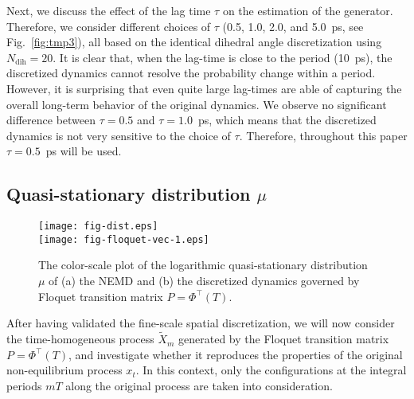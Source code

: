 \documentclass[journal=jctcce,manuscript=article]{achemso}
\newcommand{\vect}[1]{#1}
\newcommand{\myphi}{\Phi}
\newcommand{\mymu}{\mu}
\newcommand{\dih}{\textrm{dih}}
\begin{document}
Next, we discuss the effect of the lag time $\tau$ on the estimation of the generator. Therefore, we consider 
different choices of $\tau$ (0.5, 1.0, 2.0, and 5.0~ps, see Fig.~\ref{fig:tmp3}), all based on the identical dihedral angle discretization using $N_\dih=20$.
It is clear that, when the lag-time is close to the period (10~ps), the
discretized dynamics cannot resolve the probability change within a
period. However, it is surprising  that even quite large lag-times are able of capturing 
the overall long-term behavior of the original dynamics.
We observe no significant difference between $\tau=0.5$ and
$\tau=1.0$~ps, which means that the discretized dynamics is not very sensitive
to the choice of $\tau$.
Therefore, throughout this paper $\tau=0.5$~ps will be used.



\subsection{Quasi-stationary distribution $\mymu$}


\begin{figure}
  \centering  
  \texttt{[image: fig-dist.eps]}\\
  \texttt{[image: fig-floquet-vec-1.eps]}
  \caption{The color-scale plot of the logarithmic quasi-stationary distribution $\mymu$
    of (a) the NEMD  and (b)
    the discretized dynamics governed by Floquet transition matrix $\vect P=\myphi^{\top}(T)$.
  }
  \label{fig:num-1}
\end{figure}

After having validated the fine-scale spatial discretization, 
we will now consider the time-homogeneous process $\tilde X_{m}$ generated by
the Floquet transition matrix $P = \Phi^{\top}(T)$, and investigate whether it
reproduces the properties of the original  non-equilibrium process $x_t$.
In this context, only the configurations at the  integral periods $mT$ along the original process
are taken into consideration.
\end{document}
